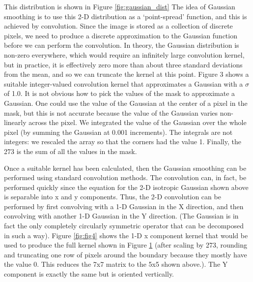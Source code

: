 \documentclass[12pt,fleqn]{book} %
\begin{document}
This distribution is shown in Figure \ref{fig:gaussian_dist}
\bigskip
The idea of Gaussian smoothing is to use this 2-D distribution as a `point-spread' function, and this is achieved by convolution. Since the image is stored as a collection of discrete pixels, we need to produce a discrete approximation to the Gaussian function before we can perform the convolution. In theory, the Gaussian distribution is non-zero everywhere, which would require an infinitely large convolution kernel, but in practice, it is effectively zero more than about three standard deviations from the mean, and so we can truncate the kernel at this point. Figure 3 shows a suitable integer-valued convolution kernel that approximates a Gaussian with a $\sigma$ of 1.0. It is not obvious how to pick the values of the mask to approximate a Gaussian.
One could use the value of the Gaussian at the center of a pixel in the mask, but this 
is not accurate because the value of the Gaussian varies non-linearly across the pixel. We 
integrated the value of the Gaussian over the whole pixel (by summing the Gaussian at 0.001 
increments). The integrals are not integers: we rescaled the array so that the corners had the value 
1. Finally, the 273 is the sum of all the values in the mask. \bigskip

Once a suitable kernel has been calculated, then the Gaussian 
smoothing can be performed using standard convolution methods. 
The convolution can, in fact, be performed quickly since the 
equation for the 2-D isotropic Gaussian shown above is separable 
into x and y components. Thus, the 2-D convolution can be 
performed by first convolving with a 1-D Gaussian in 
the X direction, and then convolving with another 1-D Gaussian in 
the Y direction. (The Gaussian is in fact the only completely 
circularly symmetric operator that can be decomposed in such a 
way). 
Figure \ref{fig:fig4} shows the 1-D x component kernel that would be used to produce the full kernel 
shown in Figure \ref{fig:fig3} (after scaling by 273, rounding and truncating one row of pixels around the 
boundary because they mostly have the value 0. This reduces the 7x7 matrix to the 5x5 shown 
above.). The Y component is exactly the same but is oriented vertically.

\begin{figure}[h]
\begin{dBox}
\centering
  \mbox{
   }
   \label{fig:fig3}   
\end{dBox}   
\end{figure}
\end{document}
